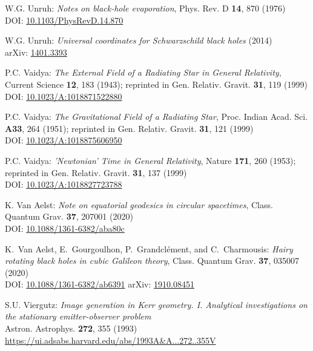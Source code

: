 \begin{thebibliography}{123}
W.G. Unruh: {\em Notes on black-hole evaporation},
Phys. Rev. D {\bf 14}, 870 (1976)\\
DOI: \href{https://doi.org/10.1103/PhysRevD.14.870}{10.1103/PhysRevD.14.870}

W.G. Unruh: {\em Universal coordinates for Schwarzschild black holes} (2014)\\
arXiv: \href{https://arxiv.org/abs/1401.3393}{1401.3393}

P.C. Vaidya:
{\em The External Field of a Radiating Star in General Relativity},
Current Science {\bf 12}, 183 (1943);
reprinted in Gen. Relativ. Gravit. {\bf 31}, 119 (1999)\\
DOI: \href{https://doi.org/10.1023/A:1018871522880}{10.1023/A:1018871522880}

P.C. Vaidya:
{\em The Gravitational Field of a Radiating Star},
Proc. Indian Acad. Sci. {\bf A33}, 264 (1951);
reprinted in Gen. Relativ. Gravit. {\bf 31}, 121 (1999)\\
DOI: \href{https://doi.org/10.1023/A:1018875606950}{10.1023/A:1018875606950}

P.C. Vaidya:
{\em 'Newtonian' Time in General Relativity},
Nature {\bf 171}, 260 (1953);
reprinted in Gen. Relativ. Gravit. {\bf 31}, 137 (1999)\\
DOI: \href{https://doi.org/10.1023/A:1018827723788}{10.1023/A:1018827723788}

K. Van Aelst: {\em Note on equatorial geodesics in circular spacetimes},
Class. Quantum Grav. {\bf 37}, 207001 (2020)\\
DOI: \href{https://doi.org/10.1088/1361-6382/aba80c}{10.1088/1361-6382/aba80c}

K.~Van Aelst, E.~Gourgoulhon, P.~Grandclément, and C.~Charmousis:
{\em Hairy rotating black holes in cubic Galileon theory},
Class. Quantum Grav. {\bf 37}, 035007 (2020)\\
DOI: \href{https://doi.org/10.1088/1361-6382/ab6391}{10.1088/1361-6382/ab6391}\hfill
arXiv: \href{https://arxiv.org/abs/1910.08451}{1910.08451}

S.U. Viergutz:
{\em Image generation in Kerr geometry. I. Analytical investigations on the stationary emitter-observer problem}\\
Astron. Astrophys. {\bf 272}, 355 (1993)\\
\url{https://ui.adsabs.harvard.edu/abs/1993A&A...272..355V}


\end{thebibliography}
